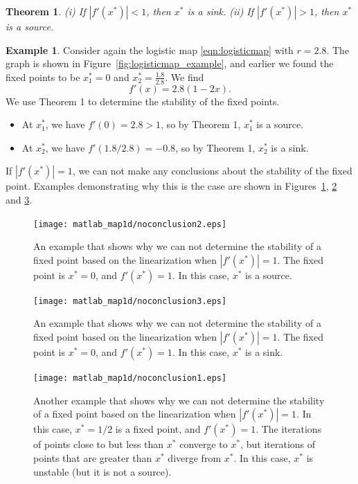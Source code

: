 \documentclass[reqno]{immbook}
\numberwithin{equation}{chapter}
\newtheorem{theorem}{Theorem}
\numberwithin{question}{section}
\numberwithin{theorem}{chapter}
\numberwithin{figure}{chapter}
\theoremstyle{definition}
\newtheorem{example}{Example}[section]
\begin{document}
\begin{theorem}
(i) If $|f'(x^*)| < 1$, then $x^*$ is a sink.
(ii) If $|f'(x^*)| > 1$, then $x^*$ is a source.
\end{theorem}

\begin{example}
Consider again the logistic map \eqref{eqn:logisticmap}
with $r=2.8$.  The graph is shown in
Figure~\ref{fig:logisticmap_example}, and earlier we found the
fixed points to be $x^*_1=0$ and $x^*_2=\frac{1.8}{2.8}$.
We find
\begin{equation}
  f'(x) = 2.8(1-2x).
\end{equation}
We use Theorem 1 to determine the stability of the fixed points.
\begin{itemize}
\item
At $x^*_1$, we have $f'(0) = 2.8 > 1$, so by Theorem 1,
$x^*_1$ is a source.
\item
At $x^*_2$, we have $f'(1.8/2.8) = -0.8$,
so by Theorem 1,
$x^*_2$ is a sink.
\end{itemize}
\end{example}

\bigskip
If $|f'(x^*)|=1$, we can not make any conclusions about the
stability of the fixed point.  Examples demonstrating why this
is the case are shown in Figures~\ref{fig:noconclusion2},
\ref{fig:noconclusion3}
and \ref{fig:noconclusion1}.
%
\begin{figure}
\centerline{%
\texttt{[image: matlab\_map1d/noconclusion2.eps]}%
}
\caption{An example that shows why we can not determine
the stability of a fixed point based on the linearization
when
$|f'(x^*)|=1$.  The fixed point is $x^*=0$, and $f'(x^*)=1$.
In this case, $x^*$ is a source.}
\label{fig:noconclusion2}
\end{figure}
%
\begin{figure}
\centerline{%
\texttt{[image: matlab\_map1d/noconclusion3.eps]}%
}
\caption{An example that shows why we can not determine
the stability of a fixed point based on the linearization
when
$|f'(x^*)|=1$.  The fixed point is $x^*=0$, and $f'(x^*)=1$.
In this case, $x^*$ is a sink.}
\label{fig:noconclusion3}
\end{figure}
%
\begin{figure}
\centerline{%
\texttt{[image: matlab\_map1d/noconclusion1.eps]}%
}
\caption{Another example that shows why we can not determine
the stability of a fixed point based on the linearization
when
$|f'(x^*)|=1$.  In this case, $x^*=1/2$ is a fixed point,
and $f'(x^*)=1$.
The iterations of points close to but less than $x^*$
converge to $x^*$, but iterations of points that are
greater than $x^*$ diverge from $x^*$.
In this case, $x^*$ is unstable (but it is not a source).
}
\label{fig:noconclusion1}
\end{figure}
\end{document}
